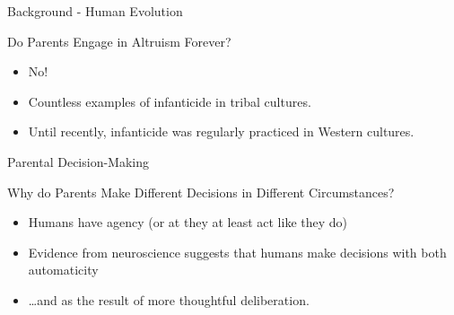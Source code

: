 \documentclass[handout]{beamer}
\begin{document}
\begin{frame}{Background - Human Evolution}

\begin{block}{Do Parents Engage in Altruism Forever?}

\begin{itemize}[<+->]
\itemsep1pt\parskip0pt
\item
  No!
\end{itemize}

\begin{itemize}[<+->]
\itemsep1pt\parskip0pt
\item
  Countless examples of infanticide in tribal cultures.
\end{itemize}

\begin{itemize}[<+->]
\itemsep1pt\parskip0pt
\item
  Until recently, infanticide was regularly practiced in Western
  cultures.
\end{itemize}

\end{block}

\end{frame}

\begin{frame}{Parental Decision-Making}

\begin{block}{Why do Parents Make Different Decisions in Different
Circumstances?}

\begin{itemize}[<+->]
\itemsep1pt\parskip0pt
\item
  Humans have agency (or at they at least act like they do)
\end{itemize}

\begin{itemize}[<+->]
\itemsep1pt\parskip0pt
\item
  Evidence from neuroscience suggests that humans make decisions with
  both automaticity
\end{itemize}

\begin{itemize}[<+->]
\itemsep1pt\parskip0pt
\item
  \ldots{}and as the result of more thoughtful deliberation.
\end{itemize}

\end{block}

\end{frame}
\end{document}
